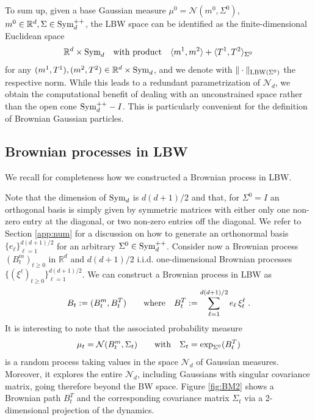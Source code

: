 \documentclass{article}
\theoremstyle{plain}
\theoremstyle{definition}
\theoremstyle{remark}
\newcommand{\Rd}{ {\mathbb{R}^d}}
\newcommand{\sym}{\textup{Sym}_d}
\newcommand{\pd}{\textup{Sym}^{++}_d}
\begin{document}
To sum up, given a base Gaussian measure $\mu^0 = \mathcal{N}(m^0, \Sigma^0)$, $m^0\in \Rd, \Sigma \in \pd$, the LBW space can be identified as the finite-dimensional Euclidean space
\begin{equation}
\label{eq:LBW}
\Rd \times \sym \quad \textup{with product} \quad \langle m^1 , m^2\rangle + \langle T^1, T^2 \rangle_{\Sigma^0} 
\end{equation}
for any $(m^1, T^1), (m^2, T^2)\in\Rd \times \sym$, and we denote with $\|\cdot \|_{\textup{LBW}(\Sigma^0)}$ the respective norm.
While this leads to a redundant parametrization of $\mathcal{N}_d$, we obtain the computational benefit of dealing with an unconstrained space rather than the open cone $\pd - I$. This is particularly convenient for the definition of Brownian Gaussian particles. 

\subsection{Brownian processes in LBW}
\label{sec:brown}

We recall for completeness how we constructed a Brownian process in LBW.

Note that the dimension of $\sym$ is $d(d+1)/2$ and that, for $\Sigma^0 = I$ an orthogonal basis is simply given by symmetric matrices with either only one non-zero entry at the diagonal, or two non-zero entries off the diagonal. We refer to Section \cref{app:num} for a discussion on how to generate an orthonormal basis $\{e_\ell\}_{\ell = 1}^{d(d+1)/2}$ for an arbitrary $\Sigma^0\in \pd$.
Consider now a Brownian process $(B_t^m)_{t\geq 0}$ in $\Rd$ and $d(d+1)/2$ i.i.d. one-dimensional Brownian processes $\{(\xi^\ell)_{t\geq 0}\}_{\ell = 1}^{d(d+1)/2}$. We can construct a Brownian process in LBW as
\begin{equation} \label{eq:BM}
B_t:= (B_t^m, B_t^T) \qquad \textup{where} \quad B^T_t:= \sum_{\ell=1}^{d(d+1)/2} e_\ell\, \xi_t^\ell\;.
\end{equation}
It is interesting to note that the associated probability measure
\[
\mu_t = \mathcal{N}(B^m_t, \Sigma_t) \qquad \textup{with} \quad \Sigma_t = \exp_{\Sigma^0}(B_t^T) 
\]
is a random process taking values in the space $\mathcal{N}_d$ of Gaussian measures. Moreover, it explores the entire $\mathcal{N}_d$, including Gaussians with singular covariance matrix, going therefore beyond the BW space. Figure \ref{fig:BM2} shows a Brownian path $B_t^T$ and the corresponding covariance matrix $\Sigma_t$ via a 2-dimensional projection of the dynamics. 
\end{document}
